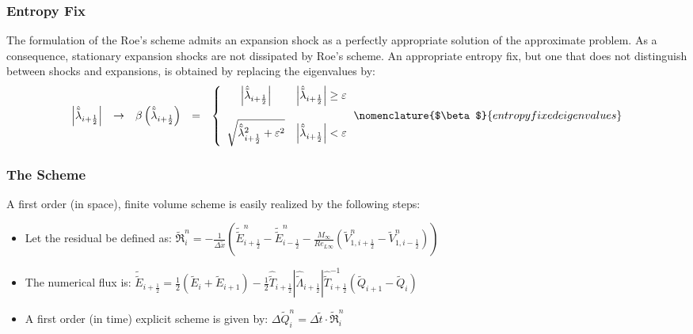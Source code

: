 \documentclass[11pt, a4paper]{article}
\begin{document}
\subsubsection{Entropy Fix}
The formulation of the Roe's scheme admits an expansion shock as a perfectly appropriate solution of the approximate problem. As a consequence, stationary expansion shocks are not dissipated by Roe's scheme. An appropriate entropy fix, but one that does not distinguish between shocks and expansions, is obtained by replacing the eigenvalues by:
\begin{equation}
    \begin{matrix}
        \left|\hat{\tilde{\lambda}}_{i+\frac{1}{2}}\right| & \rightarrow & \beta\left(\hat{\tilde{\lambda}}_{i+\frac{1}{2}}\right) & = & \left\{\begin{array}{cc}
            \left|\hat{\tilde{\lambda}}_{i+\frac{1}{2}}\right| & \left|\hat{\tilde{\lambda}}_{i+\frac{1}{2}}\right|\ge\varepsilon \\\\
            \sqrt{\hat{\tilde{\lambda}}_{i+\frac{1}{2}}^2+\varepsilon^2} & \left|\hat{\tilde{\lambda}}_{i+\frac{1}{2}}\right|<\varepsilon
        \end{array}\right.
    \end{matrix}
    \nomenclature{$\beta$}{entropy fixed eigenvalues}
\end{equation}

\subsubsection{The Scheme}
A first order (in space), finite volume scheme is easily realized by the following steps:
\begin{itemize}
    \item Let the residual be defined as: $\displaystyle\tilde{\mathfrak{R}}_i^n=-\frac{1}{\Delta\tilde{x}}\left(\tilde{\tilde{E}}_{i+\frac{1}{2}}^n-\tilde{\tilde{E}}_{i-\frac{1}{2}}^n-\frac{M_\infty}{Re_{L\infty}}\left(\tilde{V}_{1,i+\frac{1}{2}}^{n}-\tilde{V}_{1,i-\frac{1}{2}}^{n}\right)\right)$
    \item The numerical flux is: $\displaystyle\tilde{\tilde{E}}_{i+\frac{1}{2}}=\frac{1}{2}\left(\tilde{E}_{i}+\tilde{E}_{i+1}\right)-\frac{1}{2}\hat{\tilde{T}}_{i+\frac{1}{2}}\left|\hat{\tilde{\Lambda}}_{i+\frac{1}{2}}\right|\hat{\tilde{T}}^{-1}_{i+\frac{1}{2}}\left(\tilde{Q}_{i+1}-\tilde{Q}_{i}\right)$
    \item A first order (in time) explicit scheme is given by: $\Delta\tilde{Q}_i^n=\Delta\tilde{t}\cdot\tilde{\mathfrak{R}}_i^n$
\end{itemize}
\end{document}
